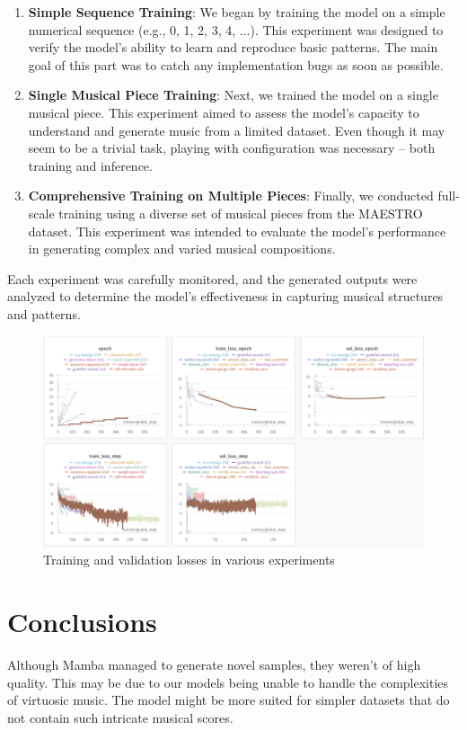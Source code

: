 \documentclass[conference]{IEEEtran}
\begin{document}
\begin{enumerate}
    \item \textbf{Simple Sequence Training}: We began by training the model on a simple numerical sequence (e.g., 0, 1, 2, 3, 4, ...). This experiment was designed to verify the model's ability to learn and reproduce basic patterns. The main goal of this part was to catch any implementation bugs as soon as possible.

    \item \textbf{Single Musical Piece Training}: Next, we trained the model on a single musical piece. This experiment aimed to assess the model's capacity to understand and generate music from a limited dataset. Even though it may seem to be a trivial task, playing with configuration was necessary – both training and inference.

    \item \textbf{Comprehensive Training on Multiple Pieces}: Finally, we conducted full-scale training using a diverse set of musical pieces from the MAESTRO dataset. This experiment was intended to evaluate the model's performance in generating complex and varied musical compositions.
\end{enumerate}

Each experiment was carefully monitored, and the generated outputs were analyzed to determine the model's effectiveness in capturing musical structures and patterns.

\begin{figure}[!htbp]
    \centering \includegraphics[width=\linewidth]{../assets/train.png}
    \caption{Training and validation losses in various experiments}
    \label{fig:synth}
\end{figure}

\section{Conclusions}
Although Mamba managed to generate novel samples, they weren't of high quality. This may be due to our models being unable to handle the complexities of virtuosic music. The model might be more suited for simpler datasets that do not contain such intricate musical scores.
\end{document}
